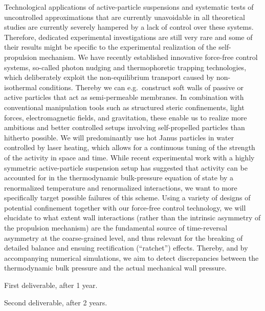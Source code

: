 \begin{workpackage}[id=WP_active,wphases=0-48,
  short=Active Particle Suspensions,%
  title=Probing Active Particle Suspensions with Colloids and Polymers,
  lead=Leipzig,
  LeipzigRM=12]
\begin{tasklist}
  \begin{task}[title=Active-Particle Suspensions,id=task2,PM=15,lead=Leipzig,wphases=12-42!0.5]
    Technological applications of active-particle suspensions and systematic tests of uncontrolled approximations that are currently unavoidable in all theoretical studies are currently severely hampered by a lack of control over these systems. 
    Therefore, dedicated experimental investigations are still very rare and some of their results might be specific to the experimental realization of the self-propulsion mechanism.
    We have recently established innovative force-free control systems, so-called photon nudging and thermophoretic trapping technologies, which deliberately exploit the non-equilibrium transport caused by non-isothermal conditions. 
    Thereby we can e.g.\ construct soft walls of passive or active particles that act as semi-permeable membranes.
    In combination with conventional manipulation tools such as structured steric confinements, light forces, electromagnetic fields, and gravitation, these enable us to realize more ambitious and better controlled setups involving self-propelled particles than hitherto possible. 
    We will predominantly use hot Janus particles in water controlled by laser heating, which allows for a continuous tuning of the strength of the activity in space and time. 
    While recent experimental work with a highly symmetric active-particle suspension setup has suggested that activity can be accounted for in the thermodynamic bulk-pressure equation of state by a renormalized temperature and renormalized interactions, we want to more specifically target possible failures of this scheme. 
    Using a variety of designs of potential confinement together with our force-free control technology, we will elucidate to what extent wall interactions (rather than the intrinsic asymmetry of the propulsion mechanism) are the fundamental source of time-reversal asymmetry at the coarse-grained level, and thus relevant for the breaking of detailed balance and ensuing rectification (``ratchet'') effects. 
    Thereby, and by accompanying numerical simulations, we aim to detect discrepancies between the thermodynamic bulk pressure and the actual mechanical wall pressure. 
\end{task}


\end{tasklist}

\begin{wpdelivs}
  \begin{wpdeliv}[due=12,id=mydeliv1,dissem=PU,nature=DEM,lead=Leipzig]
      {First deliverable, after 1 year.}
  \end{wpdeliv}
  \begin{wpdeliv}[due=24,id=mydeliv2,dissem=PU,nature=DEM,lead=Leipzig]
      {Second deliverable, after 2 years.}
\end{wpdeliv}
\end{wpdelivs}

\end{workpackage}

